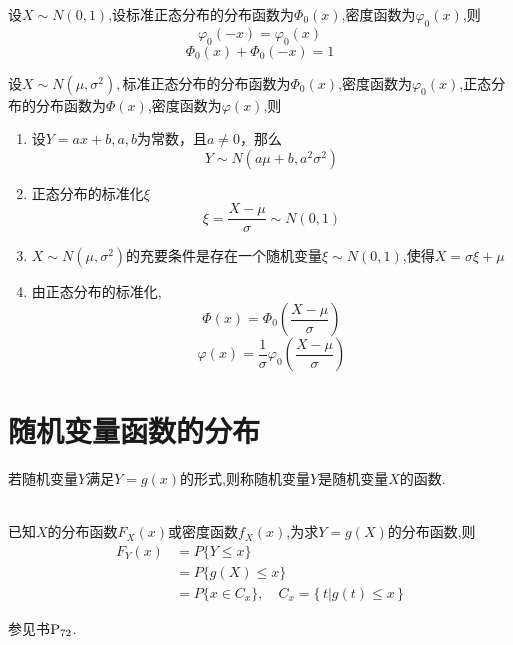 \theorem[标准正态分布的性质]
设$X\sim N(0,1)$,设标准正态分布的分布函数为$\Phi_0(x)$,密度函数为$\varphi _0(x)$,则
\begin{equation}
\varphi_0(-x)=\varphi_0(x)
\end{equation}
\begin{equation}
\Phi_0(x)+\Phi_0(-x)=1
\end{equation}

\theorem[正态分布的性质]
设$X\sim N(\mu ,\sigma^2 ),$标准正态分布的分布函数为$\Phi_0(x)$,密度函数为$\varphi_0(x)$,正态分布的分布函数为$\Phi(x)$,密度函数为$\varphi(x)$,则
\begin{enumerate}[1.]
	\setlength{\itemindent}{2em}
	\setlength{\topsep}{0.01em}
	\setlength{\itemsep}{0.01em}
	\item 设$Y=ax+b,a,b$为常数，且$a \ne 0$，那么
	\begin{equation}
	Y\sim N(a\mu +b,a^2\sigma^2)
	\end{equation}
	\item 正态分布的标准化$\xi$
	\begin{equation}
	\xi = \frac{X-\mu }{\sigma }\sim N(0,1)
	\end{equation}
	\item $X\sim N(\mu ,\sigma^2 )$的充要条件是存在一个随机变量$\xi \sim N(0,1)$,使得$X=\sigma \xi +\mu $
	\item 由正态分布的标准化,
	\begin{equation}
	\Phi(x)=\Phi_0\left(\frac{X-\mu }{\sigma } \right)
	\end{equation}
	\begin{equation}
	\varphi(x)=\frac{1}{\sigma }\varphi_0\left(\frac{X-\mu}{\sigma } \right) 
	\end{equation}
\end{enumerate}

\section{随机变量函数的分布}
若随机变量$Y$满足$Y=g(x)$的形式,则称随机变量$Y$是随机变量$X$的函数.\jg\\
\dya[离散型随机变量的分布]\jg\\
\dya[连续型随机变量的分布]\jg
\par 已知$X$的分布函数$F_X(x)$或密度函数$f_X(x)$,为求$Y=g(X)$的分布函数,则
\begin{equation}
\begin{split}
F_Y(x)&=P \lbrace Y \le x \rbrace\\
&=P \lbrace g(X) \le x \rbrace \\
&= P\lbrace x \in C_x \rbrace,\quad C_x= \lbrace \, t | g(t) \le x \,\rbrace 
\end{split}
\end{equation}
\jg
\par 参见书$\rm{P}_{72}$.


